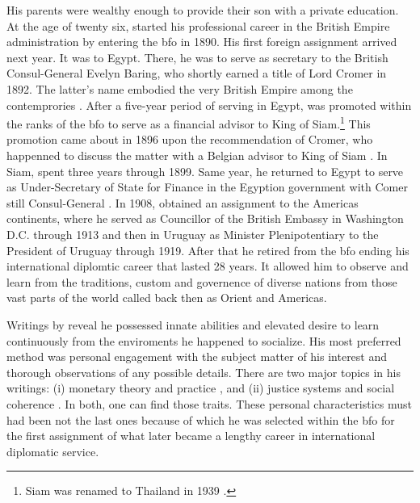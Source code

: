 His parents were wealthy enough to provide their son with a private education. At the age of twenty six, \citeauthor{innes1913} started his professional career in the British Empire administration by entering the \ac{bfo} in 1890. His first foreign assignment arrived next year. It was to Egypt. There, he was to serve as secretary to the British Consul-General Evelyn Baring, who shortly earned a title of Lord Cromer in 1892. The latter's name embodied the very British Empire among the contemprories \citep{courtney1918,tignor1963,roger2004}. After a five-year period of serving in Egypt, \citeauthor{innes1913} was promoted within the ranks of the \ac{bfo} to serve as a financial advisor to King of Siam.\footnote{Siam was renamed to Thailand in 1939 \citep[p.~267]{queralt2022}.} This promotion came about in 1896 upon the recommendation of Cromer, who happenned to discuss the matter with a Belgian advisor to King of Siam \citep[pp.~67-68]{primel2016}. In Siam, \citeauthor{innes1913} spent three years through 1899. Same year, he returned to Egypt to serve as Under-Secretary of State for Finance in the Egyption government \citep[pp.~3-7]{wray2004} with Comer still Consul-General \citep{roger2004}. In 1908, \citeauthor{innes1913} obtained an assignment to the Americas continents, where he served as Councillor of the British Embassy in Washington D.C. through 1913 and then in Uruguay as Minister Plenipotentiary to the President of Uruguay through 1919. After that he retired from the \ac{bfo} ending his international diplomtic career that lasted 28 years. It allowed him to observe and learn from the traditions, custom and governence of diverse nations from those vast parts of the world called back then as Orient and Americas. 

Writings by \citeauthor{innes1913} reveal he possessed innate abilities and elevated desire to learn continuously from the enviroments he happened to socialize. His most preferred method was personal engagement with the subject matter of his interest and thorough observations of any possible details. There are two major topics in his writings: (i) monetary theory and practice \citep{innes1910,innes1913,innes1914}, and (ii) justice systems and social coherence \citep{innes1907,innes1909,innes1913_}. In both, one can find those traits. These personal characteristics must had been not the last ones because of which he was selected within the \ac{bfo} for the first assignment of what later became a lengthy career in international diplomatic service. 

